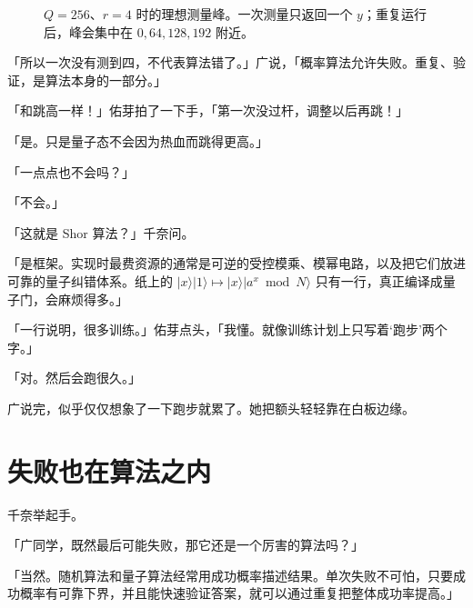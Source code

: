 \begin{figure}[htbp]
\centering
{}
\caption{$Q=256$、$r=4$ 时的理想测量峰。一次测量只返回一个 $y$；重复运行后，峰会集中在 $0,64,128,192$ 附近。}
\label{fig:ch07-phase-peaks}
\end{figure}

\FloatBarrier

「所以一次没有测到四，不代表算法错了。」广说，「概率算法允许失败。重复、验证，是算法本身的一部分。」

「和跳高一样！」佑芽拍了一下手，「第一次没过杆，调整以后再跳！」

「是。只是量子态不会因为热血而跳得更高。」

「一点点也不会吗？」

「不会。」

「这就是 Shor 算法？」千奈问。

「是框架。实现时最费资源的通常是可逆的受控模乘、模幂电路，以及把它们放进可靠的量子纠错体系。纸上的 $\lvert x\rangle\lvert1\rangle\mapsto\lvert x\rangle\lvert a^x\bmod N\rangle$ 只有一行，真正编译成量子门，会麻烦得多。」

「一行说明，很多训练。」佑芽点头，「我懂。就像训练计划上只写着‘跑步’两个字。」

「对。然后会跑很久。」

广说完，似乎仅仅想象了一下跑步就累了。她把额头轻轻靠在白板边缘。

\section{失败也在算法之内}

千奈举起手。

「广同学，既然最后可能失败，那它还是一个厉害的算法吗？」

「当然。随机算法和量子算法经常用成功概率描述结果。单次失败不可怕，只要成功概率有可靠下界，并且能快速验证答案，就可以通过重复把整体成功率提高。」

